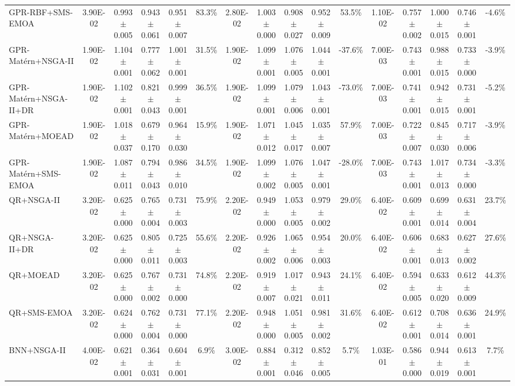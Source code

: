 \begin{table}[htbp]
{\begin{tabular}{l c c c c c c c c c c c c c c c}
GPR-RBF+SMS-EMOA & 3.90E-02 & 0.993$\pm$0.005 & 0.943$\pm$0.061 & 0.951$\pm$0.007 & 83.3\% & 2.80E-02 & 1.003$\pm$0.000 & 0.908$\pm$0.027 & 0.952$\pm$0.009 & 53.5\% & 1.10E-02 & 0.757$\pm$0.002 & 1.000$\pm$0.015 & 0.746$\pm$0.001 & -4.6\% \\
GPR-Mat\'ern+NSGA-II & 1.90E-02 & 1.104$\pm$0.001 & 0.777$\pm$0.062 & 1.001$\pm$0.001 & 31.5\% & 1.90E-02 & 1.099$\pm$0.001 & 1.076$\pm$0.005 & 1.044$\pm$0.001 & -37.6\% & 7.00E-03 & 0.743$\pm$0.001 & 0.988$\pm$0.015 & 0.733$\pm$0.000 & -3.9\% \\
GPR-Mat\'ern+NSGA-II+DR & 1.90E-02 & 1.102$\pm$0.001 & 0.821$\pm$0.043 & 0.999$\pm$0.001 & 36.5\% & 1.90E-02 & 1.099$\pm$0.001 & 1.079$\pm$0.006 & 1.043$\pm$0.001 & -73.0\% & 7.00E-03 & 0.741$\pm$0.001 & 0.942$\pm$0.015 & 0.731$\pm$0.001 & -5.2\% \\
GPR-Mat\'ern+MOEAD & 1.90E-02 & 1.018$\pm$0.037 & 0.679$\pm$0.170 & 0.964$\pm$0.030 & 15.9\% & 1.90E-02 & 1.071$\pm$0.012 & 1.045$\pm$0.017 & 1.035$\pm$0.007 & 57.9\% & 7.00E-03 & 0.722$\pm$0.007 & 0.845$\pm$0.030 & 0.717$\pm$0.006 & -3.9\% \\
GPR-Mat\'ern+SMS-EMOA & 1.90E-02 & 1.087$\pm$0.011 & 0.794$\pm$0.043 & 0.986$\pm$0.010 & 34.5\% & 1.90E-02 & 1.099$\pm$0.002 & 1.076$\pm$0.005 & 1.047$\pm$0.001 & -28.0\% & 7.00E-03 & 0.743$\pm$0.001 & 1.017$\pm$0.013 & 0.734$\pm$0.000 & -3.3\% \\
QR+NSGA-II & 3.20E-02 & 0.625$\pm$0.000 & 0.765$\pm$0.004 & 0.731$\pm$0.003 & 75.9\% & 2.20E-02 & 0.949$\pm$0.000 & 1.053$\pm$0.005 & 0.979$\pm$0.002 & 29.0\% & 6.40E-02 & 0.609$\pm$0.001 & 0.699$\pm$0.014 & 0.631$\pm$0.004 & 23.7\% \\
QR+NSGA-II+DR & 3.20E-02 & 0.625$\pm$0.000 & 0.805$\pm$0.011 & 0.725$\pm$0.003 & 55.6\% & 2.20E-02 & 0.926$\pm$0.002 & 1.065$\pm$0.006 & 0.954$\pm$0.003 & 20.0\% & 6.40E-02 & 0.606$\pm$0.001 & 0.683$\pm$0.013 & 0.627$\pm$0.002 & 27.6\% \\
QR+MOEAD & 3.20E-02 & 0.625$\pm$0.000 & 0.767$\pm$0.002 & 0.731$\pm$0.000 & 74.8\% & 2.20E-02 & 0.919$\pm$0.007 & 1.017$\pm$0.021 & 0.943$\pm$0.011 & 24.1\% & 6.40E-02 & 0.594$\pm$0.005 & 0.633$\pm$0.020 & 0.612$\pm$0.009 & 44.3\% \\
QR+SMS-EMOA & 3.20E-02 & 0.624$\pm$0.000 & 0.762$\pm$0.004 & 0.731$\pm$0.000 & 77.1\% & 2.20E-02 & 0.948$\pm$0.000 & 1.051$\pm$0.005 & 0.981$\pm$0.002 & 31.6\% & 6.40E-02 & 0.612$\pm$0.001 & 0.708$\pm$0.014 & 0.636$\pm$0.001 & 24.9\% \\
BNN+NSGA-II & 4.00E-02 & 0.621$\pm$0.001 & 0.364$\pm$0.031 & 0.604$\pm$0.001 & 6.9\% & 3.00E-02 & 0.884$\pm$0.001 & 0.312$\pm$0.046 & 0.852$\pm$0.005 & 5.7\% & 1.03E-01 & 0.586$\pm$0.000 & 0.944$\pm$0.019 & 0.613$\pm$0.001 & 7.7\% \\

\end{tabular}}
\end{table}
